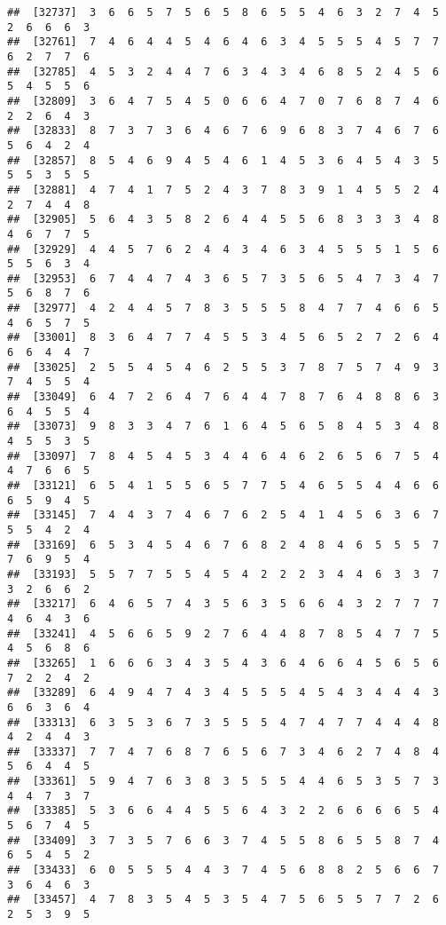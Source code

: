 \documentclass[
]{book}
\begin{document}
\begin{verbatim}
##  [32737]  3  6  6  5  7  5  6  5  8  6  5  5  4  6  3  2  7  4  5  2  6  6  6  3
##  [32761]  7  4  6  4  4  5  4  6  4  6  3  4  5  5  5  4  5  7  7  6  2  7  7  6
##  [32785]  4  5  3  2  4  4  7  6  3  4  3  4  6  8  5  2  4  5  6  5  4  5  5  6
##  [32809]  3  6  4  7  5  4  5  0  6  6  4  7  0  7  6  8  7  4  6  2  2  6  4  3
##  [32833]  8  7  3  7  3  6  4  6  7  6  9  6  8  3  7  4  6  7  6  5  6  4  2  4
##  [32857]  8  5  4  6  9  4  5  4  6  1  4  5  3  6  4  5  4  3  5  5  5  3  5  5
##  [32881]  4  7  4  1  7  5  2  4  3  7  8  3  9  1  4  5  5  2  4  2  7  4  4  8
##  [32905]  5  6  4  3  5  8  2  6  4  4  5  5  6  8  3  3  3  4  8  4  6  7  7  5
##  [32929]  4  4  5  7  6  2  4  4  3  4  6  3  4  5  5  5  1  5  6  5  5  6  3  4
##  [32953]  6  7  4  4  7  4  3  6  5  7  3  5  6  5  4  7  3  4  7  5  6  8  7  6
##  [32977]  4  2  4  4  5  7  8  3  5  5  5  8  4  7  7  4  6  6  5  4  6  5  7  5
##  [33001]  8  3  6  4  7  7  4  5  5  3  4  5  6  5  2  7  2  6  4  6  6  4  4  7
##  [33025]  2  5  5  4  5  4  6  2  5  5  3  7  8  7  5  7  4  9  3  7  4  5  5  4
##  [33049]  6  4  7  2  6  4  7  6  4  4  7  8  7  6  4  8  8  6  3  6  4  5  5  4
##  [33073]  9  8  3  3  4  7  6  1  6  4  5  6  5  8  4  5  3  4  8  4  5  5  3  5
##  [33097]  7  8  4  5  4  5  3  4  4  6  4  6  2  6  5  6  7  5  4  4  7  6  6  5
##  [33121]  6  5  4  1  5  5  6  5  7  7  5  4  6  5  5  4  4  6  6  6  5  9  4  5
##  [33145]  7  4  4  3  7  4  6  7  6  2  5  4  1  4  5  6  3  6  7  5  5  4  2  4
##  [33169]  6  5  3  4  5  4  6  7  6  8  2  4  8  4  6  5  5  5  7  7  6  9  5  4
##  [33193]  5  5  7  7  5  5  4  5  4  2  2  2  3  4  4  6  3  3  7  3  2  6  6  2
##  [33217]  6  4  6  5  7  4  3  5  6  3  5  6  6  4  3  2  7  7  7  4  6  4  3  6
##  [33241]  4  5  6  6  5  9  2  7  6  4  4  8  7  8  5  4  7  7  5  4  5  6  8  6
##  [33265]  1  6  6  6  3  4  3  5  4  3  6  4  6  6  4  5  6  5  6  7  2  2  4  2
##  [33289]  6  4  9  4  7  4  3  4  5  5  5  4  5  4  3  4  4  4  3  6  6  3  6  4
##  [33313]  6  3  5  3  6  7  3  5  5  5  4  7  4  7  7  4  4  4  8  4  2  4  4  3
##  [33337]  7  7  4  7  6  8  7  6  5  6  7  3  4  6  2  7  4  8  4  5  6  4  4  5
##  [33361]  5  9  4  7  6  3  8  3  5  5  5  4  4  6  5  3  5  7  3  4  4  7  3  7
##  [33385]  5  3  6  6  4  4  5  5  6  4  3  2  2  6  6  6  6  5  4  5  6  7  4  5
##  [33409]  3  7  3  5  7  6  6  3  7  4  5  5  8  6  5  5  8  7  4  6  5  4  5  2
##  [33433]  6  0  5  5  5  4  4  3  7  4  5  6  8  8  2  5  6  6  7  3  6  4  6  3
##  [33457]  4  7  8  3  5  4  5  3  5  4  7  5  6  5  5  7  7  2  6  2  5  3  9  5

\end{verbatim}
\end{document}
